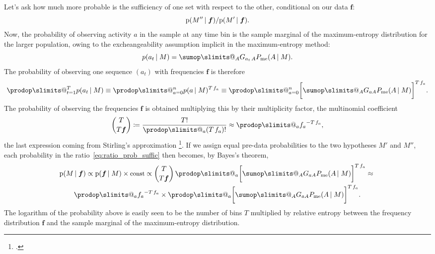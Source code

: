 \documentclass[\ifafour a4paper,12pt,\else a5paper,10pt,\fi%
onecolumn,oneside,article,%
british%
]{memoir}
\makeatletter
\theoremstyle{remark}
\theoremstyle{innote}
\def\sum{\DOTSI\sumop\slimits@}
\def\prod{\DOTSI\prodop\slimits@}
\newcommand*{\citep}{\footcites}
\newcommand*{\defd}{\coloneqq}
\newcommand*{\pf}{\mathrm{p}}%
\renewcommand*{\|}{\nonscript\,\vert\nonscript\;\mathopen{}}
\newcommand*{\yG}{G}
\newcommand*{\yAv}{A}
\newcommand*{\yav}{a}
\newcommand*{\yff}{f}
\newcommand*{\yf}{\bm{\yff}}
\newcommand*{\ya}{\yav}%
\newcommand*{\yA}{\yAv}%
\newcommand*{\px}{P_{\text{me}}}
\newcommand*{\pxx}{p}
\makeatother
\begin{document}
Let's ask how much more probable is the
sufficiency of one set with respect to the other, conditional on our data
$\yf$:
\begin{equation}
  \label{eq:ratio_prob_suffic}
  \pf(M'' \| \yf)/
  \pf(M' \| \yf).
\end{equation}
Now, the probability of observing activity $\ya$ in the sample at any time
bin is the sample marginal of the maximum-entropy distribution for the larger
population, owing to the excheangeability assumption implicit in the
maximum-entropy method:
\begin{equation}
  \label{eq:sample_marginal}
  \pxx(\ya_{t} \| M) = \sum_{\yA}\yG_{\ya_{t}\,\yA}\px(\yA \| M).
\end{equation}
The probability of observing one sequence $(\ya_{t})$ with frequencies
$\yf$ is therefore
\begin{equation}
  \label{eq:prob_frequencies}
  \prod_{t=1}^{T} \pxx(\ya_{t} \| M) \equiv
  \prod_{\ya=0}^{n} \pxx(\ya \| M)^{T\,\yff_{\ya}} \equiv
  \prod_{\ya=0}^{n}\biggl[\sum_{\yA}\yG_{\ya\yA}\px(\yA \| M)\biggr]^{T\,\yff_{\ya}}.
\end{equation}
The probability of observing the frequencies $\yf$ is obtained multiplying this
by their multiplicity factor, the multinomial coefficient
\begin{equation}
  \label{eq:multiplicity_factor}
  \binom{T}{T\yf} \defd \frac{T!}{\prod_{\ya}(T\,\yff_{\ya})!}
  \approx \prod_{\ya}{\yff_{\ya}}^{-T\,\yff_{\ya}},
\end{equation}
the last expression coming from Stirling's approximation
\citep[Lemma~2.2]{csiszaretal2004b}.
If we assign equal pre-data probabilities to the two hypotheses $M'$ and $M''$,
each probability in the ratio~\eqref{eq:ratio_prob_suffic} then becomes, by
Bayes's theorem,
\begin{multline}
  \label{eq:prob_proportional_relentropy}
  \pf(M \| \yf) \propto
  \pf(\yf \| M) \times\text{\small const} \propto
  \binom{T}{T\yf}\,  \prod_{\ya}\biggl[\sum_{\yA}\yG_{\ya\yA}\px(\yA \| M)\biggr]^{
    T\,\yff_{\ya}}
   \approx{}\\
  \prod_{\ya}{\yff_{\ya}}^{-T\,\yff_{\ya}}
  \times
  \prod_{\ya}\biggl[\sum_{\yA}\yG_{\ya\yA}\px(\yA \| M)\biggr]^{
    T\,\yff_{\ya}}.
\end{multline}
The logarithm of the probability above is easily seen to be the number of
bins $T$ multiplied by relative entropy between the frequency distribution
$\yf$ and the sample marginal of the maximum-entropy distribution.
\end{document}
